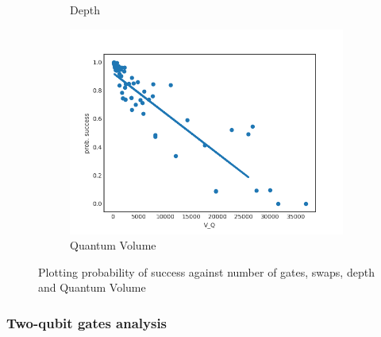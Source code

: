 \documentclass[11pt]{article}
\begin{document}
\begin{figure}[H]
\begin{subfigure}[b]{0.5\linewidth}
    \caption{Depth} 
    \label{fig:ps_d_3000_0} 
  \end{subfigure}%
  \begin{subfigure}[b]{0.5\linewidth}
    \centering
    \includegraphics[width=0.75\linewidth]{ps_q_3000_0} 
    \caption{Quantum Volume} 
    \label{fig:ps_q_3000_0} 
  \end{subfigure} 
  \caption{Plotting probability of success against number of gates, swaps, depth and Quantum Volume}
  \label{fig:ps_3000_0} 
\end{figure}

\subsubsection{Two-qubit gates analysis}
\label{sec:org09c9c2a}
\end{document}
